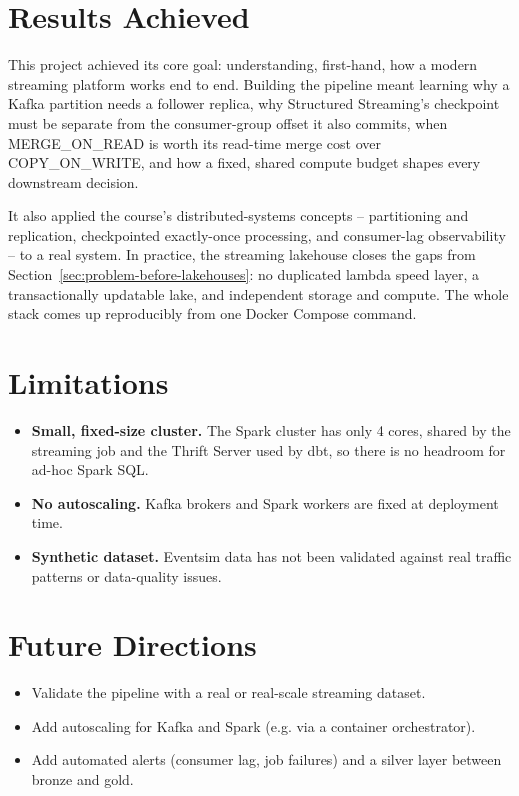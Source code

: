 \section{Results Achieved}

This project achieved its core goal: understanding, first-hand, how a modern streaming platform works end to end. Building the pipeline meant learning why a Kafka partition needs a follower replica, why Structured Streaming's checkpoint must be separate from the consumer-group offset it also commits, when MERGE\_ON\_READ is worth its read-time merge cost over COPY\_ON\_WRITE, and how a fixed, shared compute budget shapes every downstream decision.

It also applied the course's distributed-systems concepts -- partitioning and replication, checkpointed exactly-once processing, and consumer-lag observability -- to a real system. In practice, the streaming lakehouse closes the gaps from Section~\ref{sec:problem-before-lakehouses}: no duplicated lambda speed layer, a transactionally updatable lake, and independent storage and compute. The whole stack comes up reproducibly from one Docker Compose command.

\section{Limitations}

\begin{itemize}
    \item \textbf{Small, fixed-size cluster.} The Spark cluster has only 4 cores, shared by the streaming job and the Thrift Server used by dbt, so there is no headroom for ad-hoc Spark SQL.
    \item \textbf{No autoscaling.} Kafka brokers and Spark workers are fixed at deployment time.
    \item \textbf{Synthetic dataset.} Eventsim data has not been validated against real traffic patterns or data-quality issues.
\end{itemize}

\section{Future Directions}

\begin{itemize}
    \item Validate the pipeline with a real or real-scale streaming dataset.
    \item Add autoscaling for Kafka and Spark (e.g. via a container orchestrator).
    \item Add automated alerts (consumer lag, job failures) and a silver layer between bronze and gold.
\end{itemize}

